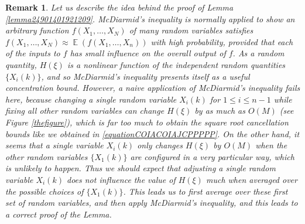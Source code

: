 \documentclass[dvipsnames,letterpaper,12pt]{article}
\numberwithin{equation}{section}
\newtheorem{remark}[theorem]{Remark}
\numberwithin{theorem}{section}
\DeclareMathOperator{\EE}{\mathbb{E}}
\begin{document}
\begin{remark}
    Let us describe the idea behind the proof of Lemma \ref{lemma24901401921209}. McDiarmid's inequality is normally applied to show an arbitrary function $f(X_1,\dots,X_N)$ of many random variables satisfies $f(X_1,\dots,X_N) \approx \EE(f(X_1,\dots,X_n))$ with high probability, provided that each of the inputs to $f$ has small influence on the overall output of $f$. As a random quantity, $H(\xi)$ is a nonlinear function of the independent random quantities $\{ X_i(k) \}$, and so McDiarmid's inequality presents itself as a useful concentration bound. However, a naive application of McDiarmid's inequality fails here, because changing a single random variable $X_i(k)$ for $1 \leq i \leq n-1$ while fixing all other random variables can change $H(\xi)$ by as much as $O(M)$ (see Figure \ref{thefigure}), which is far too much to obtain the square root cancellation bounds like we obtained in \eqref{equationCOIACOIAJCPPPPP}. On the other hand, it seems that a single variable $X_i(k)$ only changes $H(\xi)$ by $O(M)$ when the other random variables $\{ X_1(k) \}$ are configured in a very particular way, which is unlikely to happen. Thus we should expect that adjusting a single random variable $X_i(k)$ does not influence the value of $H(\xi)$ much when \emph{averaged} over the possible choices of $\{ X_1(k) \}$. This leads us to first average over these first set of random variables, and then apply McDiarmid's inequality, and this leads to a correct proof of the Lemma.
\end{remark}
\end{document}
